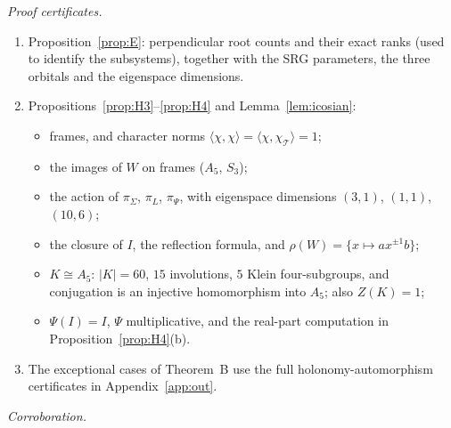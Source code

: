 \documentclass[11pt]{amsart}
\theoremstyle{definition}
\newcommand{\T}{\mathcal{T}}
\begin{document}
\emph{Proof certificates.}
\begin{enumerate}[label=(\arabic*)]
\item Proposition~\ref{prop:E}: perpendicular root counts and their exact ranks (used to identify the subsystems),
together with the SRG parameters, the three orbitals and the eigenspace dimensions.
\item Propositions~\ref{prop:H3}--\ref{prop:H4} and Lemma~\ref{lem:icosian}:
\begin{itemize}
\item frames, and character norms $\langle\chi,\chi\rangle=\langle\chi,\chi_\T\rangle=1$;
\item the images of $W$ on frames ($A_5$, $S_3$);
\item the action of $\pi_\Sigma$, $\pi_L$, $\pi_\Psi$, with eigenspace dimensions $(3,1)$, $(1,1)$, $(10,6)$;
\item the closure of $I$, the reflection formula, and $\rho(W)=\{x\mapsto ax^{\pm1}b\}$;
\item $K\cong A_5$: $|K|=60$, $15$ involutions, $5$ Klein four-subgroups, and conjugation is an injective homomorphism
into $A_5$; also $Z(K)=1$;
\item $\Psi(I)=I$, $\Psi$ multiplicative, and the real-part computation in Proposition~\ref{prop:H4}(b).
\end{itemize}
\item The exceptional cases of Theorem~B use the full holonomy-automorphism certificates in Appendix~\ref{app:out}.
\end{enumerate}
\emph{Corroboration.}
\end{document}
